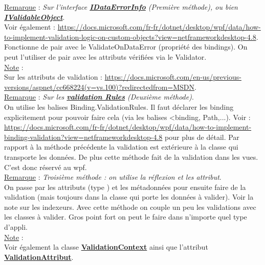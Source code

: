 \documentclass[a4paper,12pt,twoside]{article}
\newcommand{\urlcolor}{magenta}  %
\newcommand{\keycolor}{purple} %
\newcommand{\incode}[1]{{\footnotesize\ttfamily #1}} %
\newcommand{\rem}[2]{\noindent\underline{Remarque} : \textit{#1}.\\ \indent #2}
\newcommand{\note}[1]{\noindent\underline{Note} : \\ \indent #1}
\newcommand{\keyref}[2]{\hypersetup{urlcolor=\keycolor} \href{#1}{\textbf{#2}}\hypersetup{urlcolor=\urlcolor}}
\begin{document}
\rem{Sur l'interface \keyref{https://docs.microsoft.com/fr-fr/aspnet/mvc/overview/older-versions-1/models-data/validating-with-the-idataerrorinfo-interface-cs}{IDataErrorInfo} (Première méthode), ou bien \keyref{https://docs.microsoft.com/fr-fr/dotnet/api/system.componentmodel.dataannotations.ivalidatableobject?view=net-6.0}{IValidableObject}}{Voir également : \url{https://docs.microsoft.com/fr-fr/dotnet/desktop/wpf/data/how-to-implement-validation-logic-on-custom-objects?view=netframeworkdesktop-4.8}. Fonctionne de pair avec le ValidateOnDataError (propriété des bindings). On peut l'utiliser de pair avec les attributs vérifiées via le Validator.}\\

\note{Sur les attributs de validation : \url{https://docs.microsoft.com/en-us/previous-versions/aspnet/cc668224(v=vs.100)?redirectedfrom=MSDN}.}\\

\rem{Sur les \keyref{https://docs.microsoft.com/fr-fr/dotnet/api/system.windows.controls.validationrule?view=windowsdesktop-6.0}{validation Rules} (Deuxième méthode)}{On utilise les balises Binding.ValidationRules. Il faut déclarer les binding explicitement pour pouvoir faire cela (via les balises <binding, Path,...). Voir : \url{https://docs.microsoft.com/fr-fr/dotnet/desktop/wpf/data/how-to-implement-binding-validation?view=netframeworkdesktop-4.8} pour plus de détail. Par rapport à la méthode précédente la validation est extérieure à la classe qui transporte les données. De plus cette méthode fait de la validation dans les vues. C'est donc réservé au wpf.}\\

\rem{Troisième méthode : on utilise la réflexion et les attribut}{On passe par les attributs (type \incode{[required]}) et les métadonnées pour ensuite faire de la validation (mais toujours dans la classe qui porte les données à valider). Voir la note sur les indexeurs. Avec cette méthode on couple un peu les validations avec les classes à valider. Gros point fort on peut le faire dans n'importe quel type d'appli.}\\

\note{Voir également la classe \keyref{https://docs.microsoft.com/fr-fr/dotnet/api/system.componentmodel.dataannotations.validationcontext?view=net-6.0}{ValidationContext} ainsi que l'attribut \keyref{https://docs.microsoft.com/fr-fr/dotnet/api/system.componentmodel.dataannotations.validationattribute?view=net-6.0}{ValidationAttribut}.}\\
\end{document}
